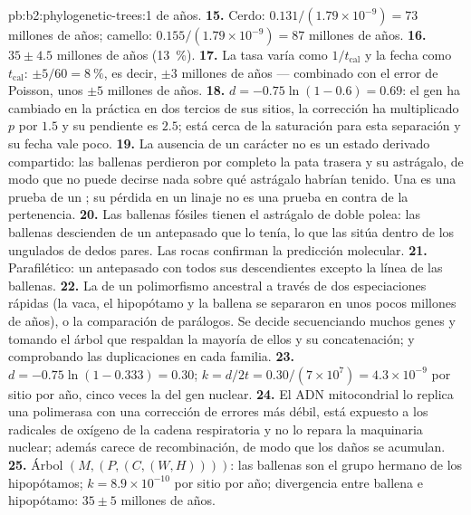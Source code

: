 \begin{solution}{pb:b2:phylogenetic-trees:1}
de años.
\textbf{15.} Cerdo: $0.131/(1.79\times 10^{-9}) = 73$ millones de años;
camello: $0.155/(1.79\times 10^{-9}) = 87$ millones de años.
\textbf{16.} $35 \pm 4.5$ millones de años (\qty{13}{\%}).
\textbf{17.} La tasa varía como $1/t_{\text{cal}}$ y la fecha como
$t_{\text{cal}}$: $\pm 5/60 = \qty{8}{\%}$, es decir, $\pm 3$ millones de
años --- combinado con el error de Poisson, unos $\pm 5$ millones de años.
\textbf{18.} $d = -0.75\ln(1 - 0.6) = 0.69$: el gen ha cambiado en la
práctica en dos tercios de sus sitios, la corrección ha multiplicado
$p$ por $1.5$ y su pendiente es $2.5$; está cerca de la saturación para
esta separación y su fecha vale poco.
\textbf{19.} La ausencia de un carácter no es un estado derivado
compartido: las ballenas perdieron por completo la pata trasera y su
astrágalo, de modo que no puede decirse nada sobre qué astrágalo habrían
tenido. Una  es una prueba de un ; su pérdida en un linaje
no es una prueba en contra de la pertenencia.
\textbf{20.} Las ballenas fósiles tienen el astrágalo de doble polea: las
ballenas descienden de un antepasado que lo tenía, lo que las sitúa dentro
de los ungulados de dedos pares. Las rocas confirman la predicción
molecular.
\textbf{21.} Parafilético: un antepasado con todos sus descendientes
excepto la línea de las ballenas.
\textbf{22.} La  de un polimorfismo
ancestral a través de dos especiaciones rápidas (la vaca, el hipopótamo y
la ballena se separaron en unos pocos millones de años), o la comparación
de parálogos. Se decide secuenciando muchos genes y tomando el árbol que
respaldan la mayoría de ellos y su concatenación; y comprobando las
duplicaciones en cada familia.
\textbf{23.} $d = -0.75\ln(1 - 0.333) = 0.30$; $k = d/2t =
0.30/(7\times 10^{7}) = 4.3\times 10^{-9}$ por sitio por año, cinco
veces la del gen nuclear.
\textbf{24.} El ADN mitocondrial lo replica una polimerasa con una
corrección de errores más débil, está expuesto a los radicales de oxígeno
de la cadena respiratoria y no lo repara la maquinaria nuclear; además
carece de recombinación, de modo que los daños se acumulan.
\textbf{25.} Árbol $(M,(P,(C,(W,H))))$: las ballenas son el grupo hermano
de los hipopótamos; $k = 8.9\times 10^{-10}$ por sitio por año; divergencia
entre ballena e hipopótamo: $35 \pm 5$ millones de años.
\end{solution}

